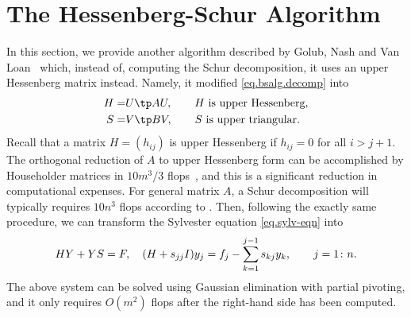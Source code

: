\documentclass{article}
\begin{document}
\section{The Hessenberg-Schur Algorithm}
\label{sec.hess-schur-algor}

In this section, we provide another algorithm described by Golub, Nash and
Van Loan~\cite{gnv79} which, instead of, computing the Schur decomposition,
it uses an upper Hessenberg matrix instead. Namely, it modified
\eqref{eq.bsalg.decomp} into
\begin{align*}
  H = & U \tp A U, \qquad \text{$H$ is upper Hessenberg,} \\
  S = & V \tp B V, \qquad \text{$S$ is upper triangular.}
\end{align*}
Recall that a matrix $H = (h_{ij})$ is upper Hessenberg if $h_{ij} = 0$ for
all $i > j + 1$. The orthogonal reduction of $A$ to upper Hessenberg form
can be accomplished by Householder matrices in $10m^{3}/3$
flops~, and this is a significant
reduction in computational expenses. For general matrix $A$, a Schur
decomposition will typically requires $10n^{3}$ flops according to
. Then, following the exactly same procedure, we can
transform the Sylvester equation \eqref{eq.sylv-eqn} into
\begin{equation}\notag
  HY + YS = F, \quad (H + s_{jj}I)y_{j} = f_{j} -
  \sum_{k=1}^{j-1}s_{kj}y_{k},
  \qquad j = 1\colon n. 
\end{equation}
The above system can be solved using Gaussian elimination with partial
pivoting, and it only requires $O(m^{2})$  flops after the right-hand side
has been computed. 







\newpage

 
\end{document}
